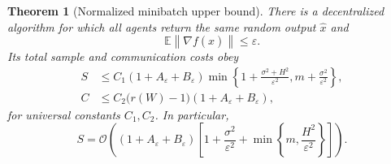 \documentclass[11pt,a4paper]{article}
\newcommand{\E}{\mathbb{E}}
\newcommand{\eps}{\varepsilon}
\newcommand{\norm}[1]{\left\lVert #1\right\rVert}
\newcommand{\cO}{\mathcal{O}}
\newtheorem{theorem}{Theorem}[section]
\theoremstyle{remark}
\begin{document}
\begin{theorem}[Normalized minibatch upper bound]
\label{thm:sample-upper}
There is a decentralized algorithm for which all agents return the same
random output $\widehat x$ and
\[
 \E\norm{\nabla f(\widehat x)}\le\eps.
\]
Its total sample and communication costs obey
\begin{align}
 S
 &\le C_1(1+A_\eps+B_\eps)
 \min\left\{
 1+\frac{\sigma^2+H^2}{\eps^2},
 m+\frac{\sigma^2}{\eps^2}
 \right\},
 \label{eq:upper-min-form}\\
 C
 &\le C_2\bigl(r(W)-1\bigr)(1+A_\eps+B_\eps),
 \label{eq:upper-communication-exact}
\end{align}
for universal constants $C_1,C_2$.  In particular,
\begin{equation}
 S=\cO\!\left(
 (1+A_\eps+B_\eps)
 \left[1+\frac{\sigma^2}{\eps^2}
 +\min\left\{m,\frac{H^2}{\eps^2}\right\}
 \right]
 \right).
 \label{eq:upper-simple-form}
\end{equation}
\end{theorem}
\end{document}

